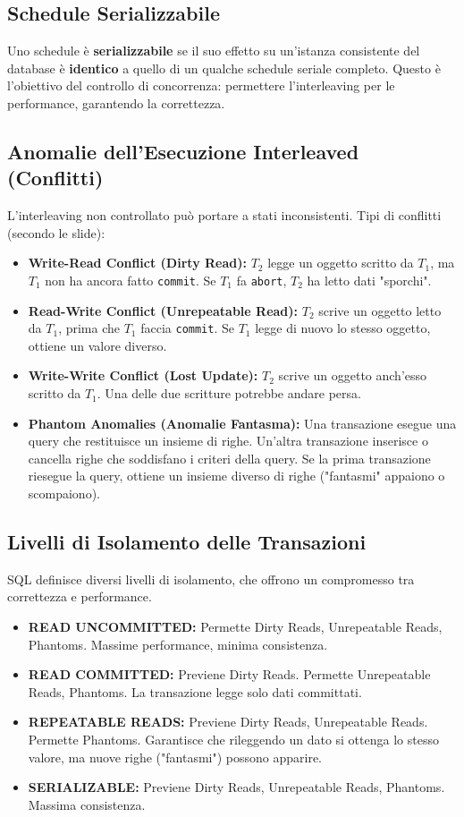 \subsection{Schedule Serializzabile}
Uno schedule è \textbf{serializzabile} se il suo effetto su un'istanza consistente del database è \textbf{identico} a quello di un qualche schedule seriale completo. Questo è l'obiettivo del controllo di concorrenza: permettere l'interleaving per le performance, garantendo la correttezza.

\subsection{Anomalie dell'Esecuzione Interleaved (Conflitti)}
L'interleaving non controllato può portare a stati inconsistenti. Tipi di conflitti (secondo le slide):
\begin{itemize}
    \item \textbf{Write-Read Conflict (Dirty Read):} $T_2$ legge un oggetto scritto da $T_1$, ma $T_1$ non ha ancora fatto \texttt{commit}. Se $T_1$ fa \texttt{abort}, $T_2$ ha letto dati "sporchi".
    \item \textbf{Read-Write Conflict (Unrepeatable Read):} $T_2$ scrive un oggetto letto da $T_1$, prima che $T_1$ faccia \texttt{commit}. Se $T_1$ legge di nuovo lo stesso oggetto, ottiene un valore diverso.
    \item \textbf{Write-Write Conflict (Lost Update):} $T_2$ scrive un oggetto anch'esso scritto da $T_1$. Una delle due scritture potrebbe andare persa.
    \item \textbf{Phantom Anomalies (Anomalie Fantasma):} Una transazione esegue una query che restituisce un insieme di righe. Un'altra transazione inserisce o cancella righe che soddisfano i criteri della query. Se la prima transazione riesegue la query, ottiene un insieme diverso di righe ("fantasmi" appaiono o scompaiono).
\end{itemize}

\subsection{Livelli di Isolamento delle Transazioni}
SQL definisce diversi livelli di isolamento, che offrono un compromesso tra correttezza e performance.
\begin{itemize}
    \item \textbf{READ UNCOMMITTED:} Permette Dirty Reads, Unrepeatable Reads, Phantoms. Massime performance, minima consistenza.
    \item \textbf{READ COMMITTED:} Previene Dirty Reads. Permette Unrepeatable Reads, Phantoms. La transazione legge solo dati committati.
    \item \textbf{REPEATABLE READS:} Previene Dirty Reads, Unrepeatable Reads. Permette Phantoms. Garantisce che rileggendo un dato si ottenga lo stesso valore, ma nuove righe ("fantasmi") possono apparire.
    \item \textbf{SERIALIZABLE:} Previene Dirty Reads, Unrepeatable Reads, Phantoms. Massima consistenza.
\end{itemize}

